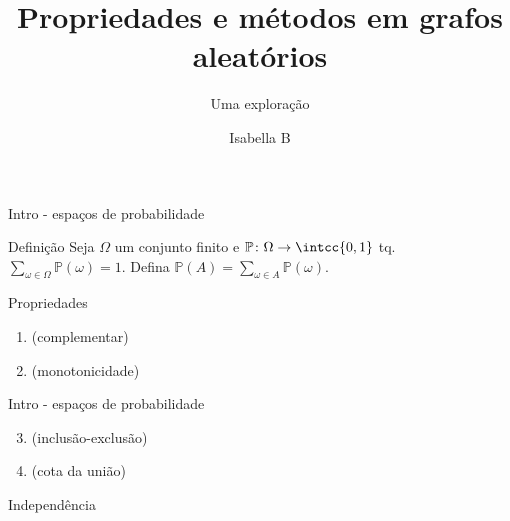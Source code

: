 \documentclass{beamer}
\title{Propriedades e métodos em grafos aleatórios}
\subtitle{Uma exploração}
\author{Isabella B}
\begin{document}
    \frame[c]{\maketitle}

    \begin{frame}{Intro - espaços de probabilidade}
        \vspace{-0.8cm}
        \begin{block}{Definição}
            Seja $\Omega$ um conjunto finito e
            $ \mathbb{P} \colon \Omega\to\intcc{0,1} $ tq.
            $ \sum_{\omega\in\Omega} \mathbb{P}(\omega) = 1 $.
            Defina
            $ \mathbb{P}(A) = \sum_{\omega\in A} \mathbb{P}(\omega) $.
        \end{block}

        \pause
        \begin{exampleblock}{Propriedades}

        \end{exampleblock}

        \vspace{-0.5cm}
        \begin{enumerate}
            \item (complementar) \vspace{\stretch2}
            \item (monotonicidade) \vspace{\stretch2}
        \end{enumerate}
    \end{frame}

    \begin{frame}{Intro - espaços de probabilidade}
        \vspace{-0.8cm}
        \begin{enumerate}
            \setcounter{enumi}{2}
            \item (inclusão-exclusão) \vspace{\stretch2}
            \item (cota da união) \vspace{\stretch3}
        \end{enumerate}
        \pause
        \begin{exampleblock}{Independência}

        \end{exampleblock} \vspace{\stretch1}
    \end{frame}
\end{document}
